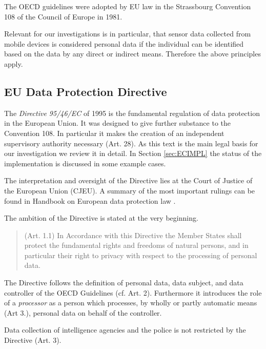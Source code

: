 The OECD guidelines were adopted by EU law in the Strassbourg Convention 108 of the Council of Europe \cite{CONV108} in 1981.

Relevant for our investigations is in particular, that sensor data collected from mobile devices is considered personal data if the individual can be identified based on the data by any direct or indirect means.
Therefore the above principles apply.


\subsection{EU Data Protection Directive}

The \emph{Directive 95/46/EC} of 1995 \cite{DIR95} is the fundamental regulation of data protection in the European Union.
It was designed to give further substance to the Convention 108.
In particular it makes the creation of an independent supervisory authority necessary (Art. 28).
As this text is the main legal basis for our investigation we review it in detail.
In Section \ref{sec:ECIMPL} the status of the implementation is discussed in some example cases.

The interpretation and oversight of the Directive lies at the Court of Justice of the European Union (CJEU).
A summary of the most important rulings can be found in Handbook on European data protection law \cite{EU_HANDBOOK_2014}.

The ambition of the Directive is stated at the very beginning.
\begin{quote}
  (Art. 1.1) In Accordance with this Directive the Member States shall protect the fundamental rights and freedoms of natural persons, and in particular their right to privacy with respect to the processing of personal data.
\end{quote}

The Directive follows the definition of personal data, data subject, and data controller of the OECD Guidelines (cf. Art. 2).
Furthermore it introduces the role of a \emph{processor} as a person which processes, by wholly or partly automatic means (Art 3.), personal data on behalf of the controller.

Data collection of intelligence agencies and the police is not restricted by the Directive (Art. 3).

